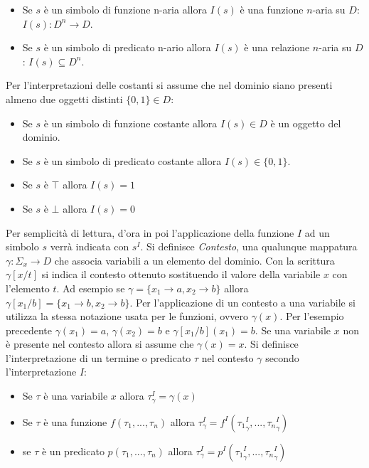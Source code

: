 \documentclass[./main.tex]{subfiles}
\begin{document}
\begin{itemize}
  \item Se $s$ è un simbolo di funzione n-aria allora $I(s)$ è una funzione $n$-aria su $D$: $I(s): D^n \rightarrow D$.
  \item Se $s$ è un simbolo di predicato n-ario allora $I(s)$ è una relazione $n$-aria su $D$: $I(s) \subseteq D^n$.
\end{itemize}

Per l'interpretazioni delle costanti si assume che nel dominio siano presenti almeno due oggetti distinti $\{0, 1\} \in D$:
\begin{itemize}
  \item Se $s$ è un simbolo di funzione costante allora $I(s) \in D$ è un oggetto del dominio.
  \item Se $s$ è un simbolo di predicato costante allora $I(s) \in \{0, 1\}$.
  \item Se $s$ è $\top$ allora $I(s) = 1$
  \item Se $s$ è $\bot$ allora $I(s) = 0$
\end{itemize}

Per semplicità di lettura, d'ora in poi l'applicazione della funzione $I$ ad un simbolo $s$ verrà indicata con $s^I$.
Si definisce \textit{Contesto}, una qualunque mappatura $\gamma : \Sigma_x \rightarrow D$ che associa variabili a un elemento del dominio.
Con la scrittura $\gamma[x/t]$ si indica il contesto ottenuto sostituendo il valore della variabile $x$ con l'elemento $t$.
Ad esempio se $\gamma = \{x_1 \rightarrow a, x_2 \rightarrow b\}$ allora $\gamma[x_1/b] = \{x_1 \rightarrow b, x_2 \rightarrow b\}$.
Per l'applicazione di un contesto a una variabile si utilizza la stessa notazione usata per le funzioni, ovvero $\gamma(x)$.
Per l'esempio precedente $\gamma(x_1) = a$, $\gamma(x_2) = b$ e $\gamma[x_1/b](x_1) = b$.
Se una variabile $x$ non è presente nel contesto allora si assume che $\gamma(x) = x$.
Si definisce l'interpretazione di un termine o predicato $\tau$ nel contesto $\gamma$ secondo l'interpretazione $I$:

\begin{itemize}
  \item Se $\tau$ è una variabile $x$ allora $\tau^I_\gamma = \gamma(x)$
  \item Se $\tau$ è una funzione $f(\tau_1, ..., \tau_n)$ allora $\tau^I_\gamma = f^I({\tau_1}^I_\gamma, ..., {\tau_n}^I_\gamma)$
  \item se $\tau$ è un predicato $p(\tau_1, ..., \tau_n)$ allora $\tau^I_\gamma = p^I({\tau_1}^I_\gamma, ..., {\tau_n}^I_\gamma)$
\end{itemize}
\end{document}
